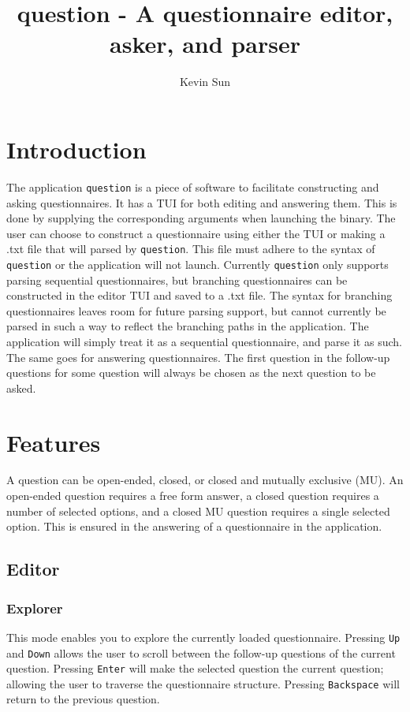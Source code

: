 \documentclass[11pt,a4paper]{article}
\author{Kevin Sun}
\title{question - A questionnaire editor, asker, and parser}
\begin{document}
\maketitle

\section{Introduction}
The application \texttt{question} is a piece of software to facilitate constructing and asking questionnaires. It has a TUI for both editing and answering them. This is done by supplying the corresponding arguments when launching the binary. The user can choose to construct a questionnaire using either the TUI or making a .txt file that will parsed by \texttt{question}. This file must adhere to the syntax of \texttt{question} or the application will not launch. Currently \texttt{question} only supports parsing sequential questionnaires, but branching questionnaires can be constructed in the editor TUI and saved to a .txt file. The syntax for branching questionnaires leaves room for future parsing support, but cannot currently be parsed in such a way to reflect the branching paths in the application. The application will simply treat it as a sequential questionnaire, and parse it as such. The same goes for answering questionnaires. The first question in the follow-up questions for some question will always be chosen as the next question to be asked.


\section{Features}
A question can be open-ended, closed, or closed and mutually exclusive (MU). An open-ended question requires a free form answer, a closed question requires a number of selected options, and a closed MU question requires a single selected option. This is ensured in the answering of a questionnaire in the application.

\subsection{Editor}
\subsubsection{Explorer}
This mode enables you to explore the currently loaded questionnaire. Pressing \texttt{Up} and \texttt{Down} allows the user to scroll between the follow-up questions of the current question. Pressing \texttt{Enter} will make the selected question the current question; allowing the user to traverse the questionnaire structure. Pressing \texttt{Backspace} will return to the previous question.
\end{document}
